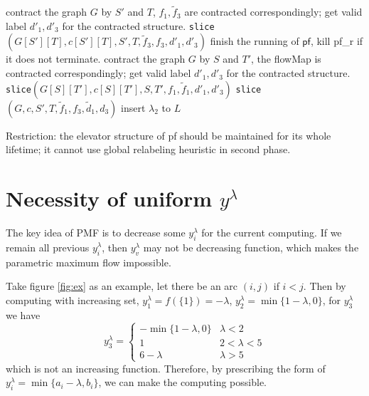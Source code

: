 \documentclass{article}
\begin{document}
\begin{algorithm}
\begin{algorithmic}[1]
\STATE contract the graph $G$ by $S'$ and $T$, $f_1, \tilde{f}_3$ are contracted correspondingly; get valid label $d'_1, d'_3$ for the contracted structure.
\STATE \texttt{slice}$(G[S'][T], c[S'][T], S', T, \tilde{f}_3, f_3, d'_1, d'_3)$
\ELSE
\STATE finish the running of $\textsf{pf}$, kill \textsf{pf\_r} if it does not terminate.
\STATE contract the graph $G$ by $S$ and $T'$, the flowMap is contracted correspondingly; get valid label $d'_1, d'_3$ for the contracted structure.
\STATE \texttt{slice}$(G[S][T'], c[S][T'], S, T', f_1, \tilde{f}_1, d'_1, d'_3)$
\STATE \texttt{slice}$(G, c, S', T, \tilde{f}_1, f_3, \tilde{d}_1, d_3)$
\ENDIF
\ELSE
\STATE insert $\lambda_2$ to $L$
\ENDIF
\ENDFUNCTION
\end{algorithmic}
\end{algorithm}

Restriction: the elevator structure of pf should be maintained for its whole lifetime; it cannot use global relabeling heuristic in second phase.
\section{Necessity of uniform $y^{\lambda}$}
The key idea of PMF is to decrease some $y^{\lambda}_i$ for the current computing. If we remain all previous $y^{\lambda}_i$, then $y^{\lambda}_v$ may not be decreasing function, which makes the parametric maximum flow impossible.

Take figure \ref{fig:ex} as an example, let there be an arc $(i,j)$ if $i<j$. Then by computing with increasing set, $y^{\lambda}_1 = f(\{1\}) = -\lambda$, $y^{\lambda}_2 = \min\{1-\lambda, 0\}$, for $y^{\lambda}_3$ we have
\begin{equation}
y_3^{\lambda} = \begin{cases} - \min\{1-\lambda, 0\} & \lambda < 2 \\
1 & 2 < \lambda < 5 \\
6-\lambda & \lambda > 5 
\end{cases}
\end{equation}
which is not an increasing function.
Therefore, by prescribing the form of $y^{\lambda}_i = \min\{a_i - \lambda, b_i\}$, we can make the computing possible.
\end{document}
